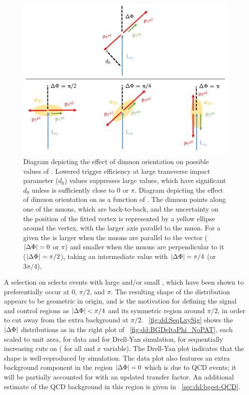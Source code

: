 \begin{figure}[htpb]
  \centering
  \includegraphics[width=1.2\DFigWidth]{figures/displaced/BGEST_WavyExplanationDiagram.pdf}
  \caption[Diagrams depicting the effect of dimuon orientation on possible values of \Lxy and \LxyErr.]{ Diagram depicting the effect of dimuon orientation on possible values of \Lxy. Lowered trigger efficiency at large transverse impact parameter ($d_0$) values suppresses large \Lxy values, which have significant $d_0$ unless \DeltaPhi is sufficiently close to 0 or $\pi$.  Diagram depicting the effect of dimuon orientation on \LxyErr as a function of \DeltaPhi. The dimuon \pT points along one of the muons, which are back-to-back, and the uncertainty on the position of the fitted vertex is represented by a yellow ellipse around the vertex, with the larger axis parallel to the muon. For a given \Lxy the \LxyErr is larger when the muons are parallel to the \Lxy vector (\ie $|\Delta\Phi| = 0$ or $\pi$) and smaller when the muons are perpendicular to it (\ie $|\Delta\Phi| = \pi/2$), taking an intermediate value with $|\Delta\Phi| = \pi/4$ (or $3\pi/4$).}
  \label{fig:dd:BGEST_WavyExplanationDiagram}
\end{figure}

\pagebreak
A selection on \LxySig selects events with large \Lxy and/or small \LxyErr, which have been shown to preferentially occur at 0, $\pi/2$, and $\pi$.
The resulting shape of the \DeltaPhi distribution appears to be geometric in origin, and is the motivation for defining the signal and control regions as $|\Delta\Phi| < \pi/4$ and its symmetric region around $\pi/2$, in order to cut away from the extra background at $\pi/2$.
\Fig~\ref{fig:dd:SeqLxySig} shows the $|\Delta\Phi|$ distributions as in the right plot of \Fig~\ref{fig:dd:BGDeltaPhi_NoPAT}, each scaled to unit area, for data and for Drell-Yan simulation, for sequentially increasing cuts on \LxySig (\ie {} for all \DeltaPhi and $x$ variable).
The Drell-Yan plot indicates that the shape is well-reproduced by simulation.
The data plot also features an extra background component in the region $|\Delta\Phi| = 0$ which is due to QCD events; it will be partially accounted for with an updated transfer factor.
An additional estimate of the QCD background in this region is given in \Sec~\ref{sec:dd:bgest-QCD}.

